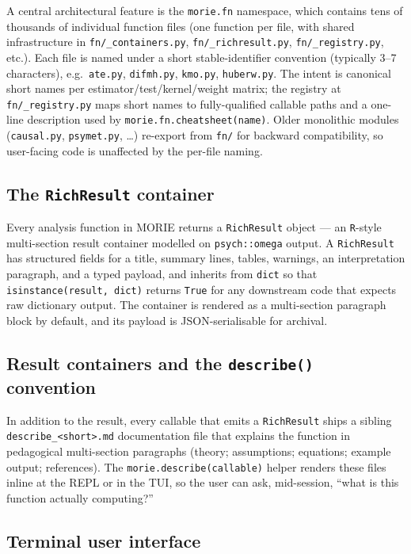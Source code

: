 \documentclass[11pt,a4paper]{article}
\theoremstyle{plain}
\theoremstyle{definition}
\theoremstyle{remark}
\begin{document}
A central architectural feature is the \texttt{morie.fn}
namespace, which contains tens of thousands of individual function
files (one function per file, with shared infrastructure in
\texttt{fn/\_containers.py}, \texttt{fn/\_richresult.py},
\texttt{fn/\_registry.py}, etc.). Each file is named under a short
stable-identifier convention (typically 3--7 characters), e.g.\
\texttt{ate.py}, \texttt{difmh.py}, \texttt{kmo.py},
\texttt{huberw.py}. The intent is canonical short names per
estimator/test/kernel/weight matrix; the registry at
\texttt{fn/\_registry.py} maps short names to fully-qualified
callable paths and a one-line description used by
\texttt{morie.fn.cheatsheet(name)}. Older monolithic modules
(\texttt{causal.py}, \texttt{psymet.py}, \ldots) re-export from
\texttt{fn/} for backward compatibility, so user-facing code is
unaffected by the per-file naming.

\subsection{The \texttt{RichResult} container}

Every analysis function in MORIE returns a
\texttt{RichResult} object --- an \texttt{R}-style multi-section
result container modelled on \texttt{psych::omega} output. A
\texttt{RichResult} has structured fields for a title, summary
lines, tables, warnings, an interpretation paragraph, and a
typed payload, and inherits from \texttt{dict} so that
\texttt{isinstance(result, dict)} returns \texttt{True} for any
downstream code that expects raw dictionary output. The container
is rendered as a multi-section paragraph block by default, and
its payload is JSON-serialisable for archival.

\subsection{Result containers and the \texttt{describe()} convention}

In addition to the result, every callable that emits a
\texttt{RichResult} ships a sibling \texttt{describe\_<short>.md}
documentation file that explains the function in pedagogical
multi-section paragraphs (theory; assumptions; equations; example
output; references). The
\texttt{morie.describe(callable)} helper renders these files
inline at the REPL or in the TUI, so the user can ask, mid-session,
``what is this function actually computing?''

\subsection{Terminal user interface}
\end{document}
